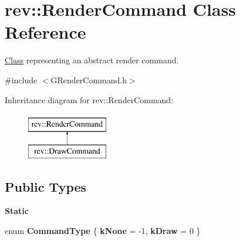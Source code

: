 \hypertarget{classrev_1_1_render_command}{}\section{rev\+::Render\+Command Class Reference}
\label{classrev_1_1_render_command}


\mbox{\hyperlink{struct_class}{Class}} representing an abstract render command.  




{\ttfamily \#include $<$G\+Render\+Command.\+h$>$}

Inheritance diagram for rev\+::Render\+Command\+:\begin{figure}[H]
\begin{center}
\leavevmode
\includegraphics[height=2.000000cm]{classrev_1_1_render_command}
\end{center}
\end{figure}
\subsection*{Public Types}
\begin{Indent}\textbf{ Static}\par
\begin{DoxyCompactItemize}
\item 
\mbox{\label{classrev_1_1_render_command_a31291c7ec9a003f4821c6f8a2adc91ab}} 
enum {\bfseries Command\+Type} \{ {\bfseries k\+None} = -\/1, 
{\bfseries k\+Draw} = 0
 \}
\end{DoxyCompactItemize}
\end{Indent}
